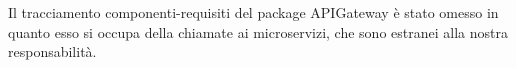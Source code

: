 		Il tracciamento componenti-requisiti del package APIGateway è stato omesso in quanto esso si occupa della chiamate ai microservizi, che sono estranei alla nostra responsabilità.


